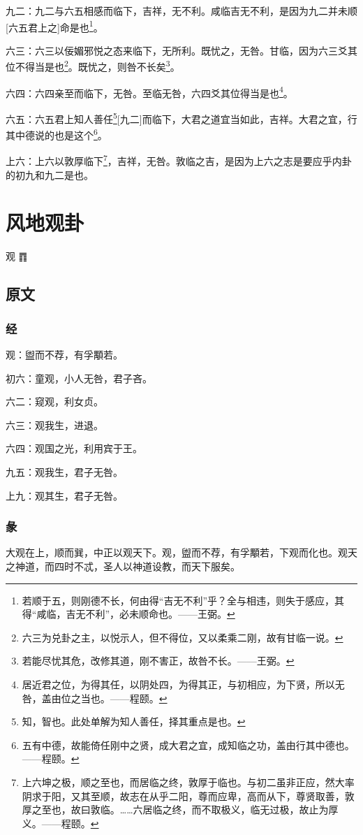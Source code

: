 \documentclass[12pt,oneside]{book}
\begin{document}
九二：九二与六五相感而临下，吉祥，无不利。咸临吉无不利，是因为九二并未顺[六五君上之]命是也\footnote{若顺于五，则刚德不长，何由得“吉无不利”乎？全与相违，则失于感应，其得“咸临，吉无不利”，必未顺命也。——王弼。}。

六三：六三以佞媚邪悦之态来临下，无所利。既忧之，无咎。甘临，因为六三爻其位不得当是也\footnote{六三为兑卦之主，以悦示人，但不得位，又以柔乘二刚，故有甘临一说。}。既忧之，则咎不长矣\footnote{若能尽忧其危，改修其道，刚不害正，故咎不长。——王弼。}。

六四：六四亲至而临下，无咎。至临无咎，六四爻其位得当是也\footnote{居近君之位，为得其任，以阴处四，为得其正，与初相应，为下贤，所以无咎，盖由位之当也。——程颐。}。

六五：六五君上知人善任\footnote{知，智也。此处单解为知人善任，择其重点是也。}[九二]而临下，大君之道宜当如此，吉祥。大君之宜，行其中德说的也是这个\footnote{五有中德，故能倚任刚中之贤，成大君之宜，成知临之功，盖由行其中德也。——程颐。}。

上六：上六以敦厚临下\footnote{上六坤之极，顺之至也，而居临之终，敦厚于临也。与初二虽非正应，然大率阴求于阳，又其至顺，故志在从乎二阳，尊而应卑，高而从下，尊贤取善，敦厚之至也，故曰敦临。……六居临之终，而不取极义，临无过极，故止为厚义。——程颐。}，吉祥，无咎。敦临之吉，是因为上六之志是要应乎内卦的初九和九二是也。



\chapter{风地观卦}
观 {\Large ䷓}

\section{原文}

\subsection{经}
观：盥而不荐，有孚顒若。

初六：童观，小人无咎，君子吝。

六二：窥观，利女贞。

六三：观我生，进退。

六四：观国之光，利用宾于王。

九五：观我生，君子无咎。

上九：观其生，君子无咎。

\subsection{彖}
大观在上，顺而巽，中正以观天下。观，盥而不荐，有孚顒若，下观而化也。观天之神道，而四时不忒，圣人以神道设教，而天下服矣。
\end{document}

